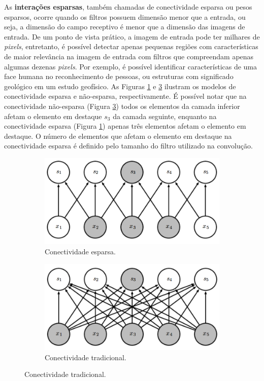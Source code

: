 As \textbf{interações esparsas}, também chamadas de conectividade esparsa ou pesos esparsos,
ocorre quando os filtros possuem dimensão menor que a entrada, ou seja, a
dimensão do campo receptivo é menor que a dimensão das imagens de entrada.
De um ponto de vista prático, a imagem de entrada pode ter milhares de \textit{pixels}, entretanto, é 
possível detectar apenas pequenas regiões com características de maior relevância na imagem de entrada
com filtros que compreendam apenas algumas dezenas \textit{pixels}.
Por exemplo, é possível identificar características de uma face humana no reconhecimento de pessoas, ou estruturas com
significado geológico em um estudo geofísico. As Figuras \ref{fig:sparse} e \ref{fig:full} ilustram
os modelos de conectividade esparsa e não-esparsa, respectivamente.
É possível notar que na conectividade não-esparsa (Figura \ref{fig:full}) todos os elementos da camada inferior
afetam o elemento em destaque $s_3$ da camada seguinte, enquanto na conectividade esparsa (Figura \ref{fig:sparse}) apenas
três elementos afetam o elemento em destaque. O número de elementos que afetam o elemento em destaque na
conectividade esparsa é definido pelo tamanho do filtro utilizado na convolução.
\begin{figure}[htp]
\begin{subfigure}{.5\textwidth}
  \centering
  \includegraphics[width=.9\linewidth]{fig/sparse}
  \caption{Conectividade esparsa.\citep{Gdfl16}}
  \label{fig:sparse}
\end{subfigure}
\begin{subfigure}{.5\textwidth}
  \centering
  \includegraphics[width=.9\linewidth]{fig/full}
  \caption{Conectividade tradicional.\citep{Gdfl16}}
  \label{fig:full}
\end{subfigure}%
\end{figure}

